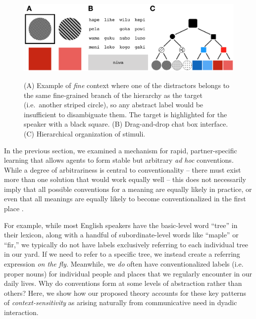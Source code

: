 
\begin{figure}[t]
\begin{center}
{\includegraphics[scale=.55]{./figures/Sec2-design.png}}
{\caption{{(A) Example of \emph{fine} context where one of the distractors belongs to the same fine-grained branch of the hierarchy as the target (i.e.\ another striped circle), so any abstract label would be insufficient to disambiguate them. The target is highlighted for the speaker with a black square. (B) Drag-and-drop chat box interface. (C) Hierarchical organization of stimuli.\label{fig:context_design}}}}
\vspace{-2ex}
\end{center}
\end{figure}

In the previous section, we examined a mechanism for rapid, partner-specific learning that allows agents to form stable but arbitrary \emph{ad hoc} conventions. 
While a degree of arbitrariness is central to conventionality -- there must exist more than one solution that would work equally well -- this does not necessarily imply that all possible conventions for a meaning are equally likely in practice, or even that all meanings are equally likely to become conventionalized in the first place \cite{HawkinsGoldstone16_SocialConventions}.

For example, while most English speakers have the basic-level word ``tree'' in their lexicon, along with a handful of subordinate-level words like ``maple'' or ``fir,'' we typically do not have labels exclusively referring to each individual tree in our yard.
If we need to refer to a specific tree, we instead create a referring expression \emph{on the fly.}
Meanwhile, we \emph{do} often have conventionalized labels (i.e. proper nouns) for individual people and places that we regularly encounter in our daily lives.
Why do conventions form at some levels of abstraction rather than others?
Here, we show how our proposed theory accounts for these key patterns of \emph{context-sensitivity} as arising naturally from communicative need in dyadic interaction.

